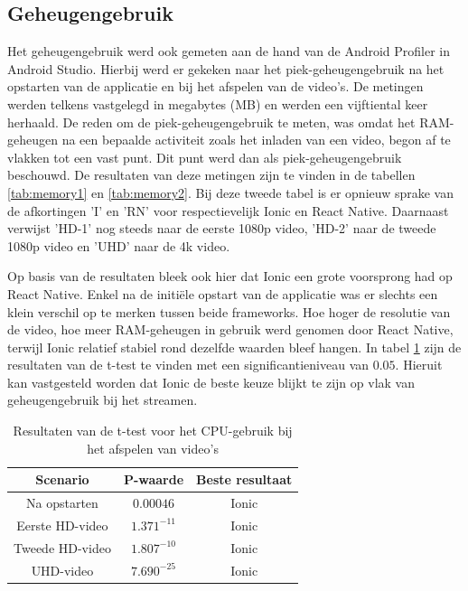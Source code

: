\subsection{Geheugengebruik}
\label{subsec:geheugengebruik}

Het geheugengebruik werd ook gemeten aan de hand van de Android Profiler in Android Studio. Hierbij werd er gekeken naar het piek-geheugengebruik na het opstarten van de applicatie en bij het afspelen van de video's. De metingen werden telkens vastgelegd in megabytes (MB) en werden een vijftiental keer herhaald. De reden om de piek-geheugengebruik te meten, was omdat het RAM-geheugen na een bepaalde activiteit zoals het inladen van een video, begon af te vlakken tot een vast punt. Dit punt werd dan als piek-geheugengebruik beschouwd. De resultaten van deze metingen zijn te vinden in de tabellen \ref{tab:memory1} en \ref{tab:memory2}. Bij deze tweede tabel is er opnieuw sprake van de afkortingen 'I' en 'RN' voor respectievelijk Ionic en React Native. Daarnaast verwijst 'HD-1' nog steeds naar de eerste 1080p video, 'HD-2' naar de tweede 1080p video en 'UHD' naar de 4k video.

Op basis van de resultaten bleek ook hier dat Ionic een grote voorsprong had op React Native. Enkel na de initiële opstart van de applicatie was er slechts een klein verschil op te merken tussen beide frameworks. Hoe hoger de resolutie van de video, hoe meer RAM-geheugen in gebruik werd genomen door React Native, terwijl Ionic relatief stabiel rond dezelfde waarden bleef hangen. In tabel \ref{tab:memory_ttest} zijn de resultaten van de t-test te vinden met een significantieniveau van \(0.05\). Hieruit kan vastgesteld worden dat Ionic de beste keuze blijkt te zijn op vlak van geheugengebruik bij het streamen.

\begin{table}[htbp]
  \centering
  \footnotesize
  \begin{tabular}{|c|c|c|}
      \hline
      \textbf{Scenario} & \textbf{P-waarde} & \textbf{Beste resultaat} \\
      \hline
      Na opstarten & \(0.00046\) & Ionic \\
      \hline
      Eerste HD-video & \(1.371^{-11}\) & Ionic \\
      \hline
      Tweede HD-video & \(1.807^{-10}\) & Ionic \\
      \hline
      UHD-video & \(7.690^{-25}\) & Ionic \\
      \hline
  \end{tabular}
  \caption{Resultaten van de t-test voor het CPU-gebruik bij het afspelen van video's}
  \label{tab:memory_ttest}
\end{table}

